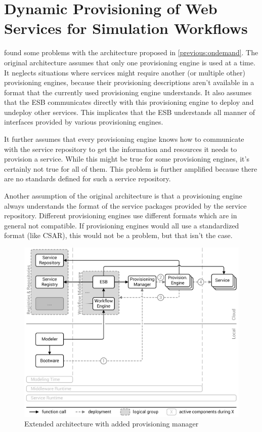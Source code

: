 \section{Dynamic Provisioning of Web Services for Simulation Workflows}
\label{previous:dynamic}

\citeauthor{provisioning:dynamic} found some problems with the architecture proposed in \autoref{previous:ondemand}.
The original architecture assumes that only one provisioning engine is used at a time.
It neglects situations where services might require another (or multiple other) provisioning engines, because their provisioning descriptions aren't available in a format that the currently used provisioning engine understands.
It also assumes that the ESB communicates directly with this provisioning engine to deploy and undeploy other services.
This implicates that the ESB understands all manner of interfaces provided by various provisioning engines.

It further assumes that every provisioning engine knows how to communicate with the service repository to get the information and resources it needs to provision a service.
While this might be true for some provisioning engines, it's certainly not true for all of them.
This problem is further amplified because there are no standards defined for such a service repository.

Another assumption of the original architecture is that a provisioning engine always understands the format of the service packages provided by the service repository.
Different provisioning engines use different formats which are in general not compatible.
If provisioning engines would all use a standardized format (like CSAR), this would not be a problem, but that isn't the case.

\begin{figure}[!htbp]
	\centering
	\includegraphics[resolution=600]{previous/assets/valeri_architecture}
	\caption{Extended architecture with added provisioning manager~\autocite[based on][]{provisioning:dynamic}}
	\label{image:valeri_architecture}
\end{figure}

